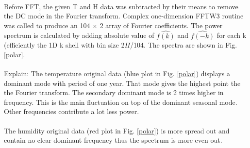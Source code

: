 \paragraph{}
  Before FFT, the given T and H data was subtracted by their means to remove the DC mode in the Fourier transform. 
  Complex one-dimension FFTW3 routine was called to produce an 104 $\times$ 2 array of Fourier coefficients. The power spectrum is calculated by adding absolute value of  $\hat{f(k)} $ and  $\hat{f(-k)} $ for each k (efficiently the 1D k shell with bin size 2$\Pi$/104. The spectra are shown in Fig. \ref{polar}.

\paragraph{}
Explain: The temperature original data (blue plot in Fig. \ref{polar}) displays a dominant mode with period of one year. That mode gives the highest point the the Fourier transform. The secondary dominant mode is 2 times higher in frequency. This is the main fluctuation on top of the dominant seasonal mode. Other frequencies contribute a lot less power.
\paragraph{}
The humidity original data (red plot in Fig. \ref{polar}) is more spread out and contain no clear dominant frequency thus the spectrum is more even out.


